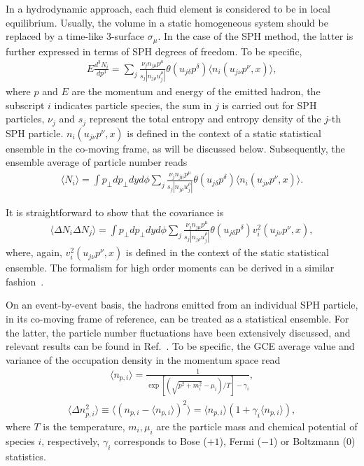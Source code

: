 \documentclass[secnumarabic, graphics,floatfix, nofootinbib,tightenlines,nobibnotes, aps, prl, 12pt]{revtex4-1}
\begin{document}
In a hydrodynamic approach, each fluid element is considered to be in local equilibrium.
Usually, the volume in a static homogeneous system should be replaced by a time-like 3-surface $\sigma_\mu$.
In the case of the SPH method, the latter is further expressed in terms of SPH degrees of freedom.
To be specific,
\begin{eqnarray}
E\frac{d^3N_i}{dp^3}=\sum_j \frac{\nu_j n_{j\mu}p^{\mu}}{s_j|n_{j\rho}u_j^{\rho}|}\theta(u_{j\delta}p^{\delta})\langle n_{i}(u_{j\nu}p^{\nu}, x) \rangle, \label{d3n-sph}
\end{eqnarray}
where $p$ and $E$ are the momentum and energy of the emitted hadron, the subscript $i$ indicates particle species, the sum in $j$ is carried out for SPH particles, $\nu_j$ and $s_j$ represent the total entropy and entropy density of the $j$-th SPH particle.
$n_{i}(u_{j\nu}p^{\nu}, x)$ is defined in the context of a static statistical ensemble in the co-moving frame, as will be discussed below.
Subsequently, the ensemble average of particle number reads
\begin{eqnarray}
\langle N_{i} \rangle=\int p_{\bot}dp_{\bot}dy d\phi \sum_j \frac{\nu_j n_{j\mu}p^{\mu}}{s_j|n_{j\rho}u_j^{\rho}|}\theta(u_{j\delta}p^{\delta})\langle n_{i}(u_{j\nu}p^{\nu}, x) \rangle .\label{NavgSPH}
\end{eqnarray}

It is straightforward to show that the covariance is
\begin{eqnarray}
\langle \Delta N_{i}\Delta N_{j} \rangle= \int p_{\bot}dp_{\bot}dy d\phi \sum_j \frac{\nu_j n_{j\mu}p^{\mu}}{s_j|n_{j\rho}u_j^{\rho}|}\theta(u_{j\delta}p^{\delta}) v_{i}^2(u_{j\nu}p^{\nu}, x) ,\label{NcovSPH}
\end{eqnarray}
where, again, $v_{i}^2(u_{j\nu}p^{\nu}, x)$ is defined in the context of the static statistical ensemble.
The formalism for high order moments can be derived in a similar fashion~\cite{sph-bes-01}.

On an event-by-event basis, the hadrons emitted from an individual SPH particle, in its co-moving frame of reference, can be treated as a statistical ensemble.
For the latter, the particle number fluctuations have been extensively discussed, and relevant results can be found in Ref.~\cite{book-landau-5}.
To be specific, the GCE average value and variance of the occupation density in the momentum space read~\cite{statistical-model-03,statistical-model-04}
\begin{eqnarray}
\langle n_{p,i} \rangle= \frac{1}{\exp\left[(\sqrt{p^2+m_i^2}-\mu_i)/T\right]-\gamma_i} , 
\end{eqnarray}
\begin{eqnarray}
\langle \Delta n_{p,i}^2 \rangle \equiv  \langle (n_{p,i} - \langle n_{p,i} \rangle)^2 \rangle = \langle n_{p,i} \rangle (1+\gamma_i \langle n_{p,i} \rangle) ,\label{Delta_npi2}
\end{eqnarray}
where $T$ is the temperature, $m_i, \mu_i$ are the particle mass and chemical potential of species $i$, respectively, $\gamma_i$ corresponds to Bose ($+1$), Fermi ($-1$) or Boltzmann ($0$) statistics.
\end{document}
